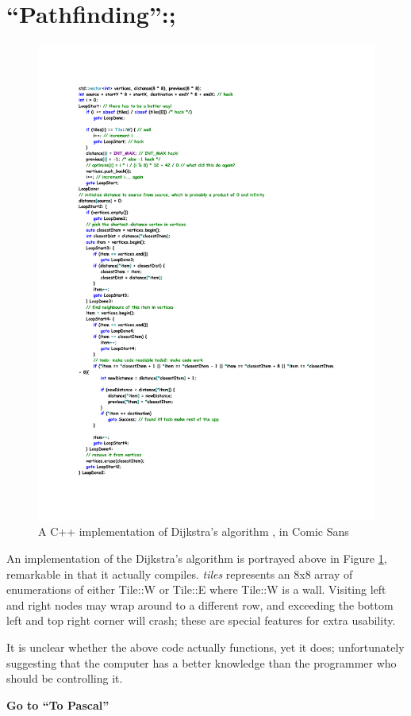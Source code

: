 \documentclass{journal}
\begin{document}
\section{``Pathfinding'':;}
\begin{figure}[h]
\includegraphics[width=0.8\linewidth,scale=0.9]{Pathfinding.pdf}
\caption{A C++ implementation of Dijkstra's algorithm \cite{pathfinding}, in Comic Sans}
\label{fig:comicsans}
\end{figure}

An implementation of the Dijkstra's algorithm \cite{pathfinding} is portrayed above in Figure \ref{fig:comicsans}, remarkable in that it actually compiles. \textit{tiles} represents an 8x8 array of enumerations of either Tile::W or Tile::E where Tile::W is a wall. Visiting left and right nodes may wrap around to a different row, and exceeding the bottom left and top right corner will crash; these are special features for extra usability.

It is unclear whether the above code actually functions, yet it does; unfortunately suggesting that the computer has a better knowledge than the programmer who should be controlling it.

\textbf{Go to ``To Pascal''}



\end{document}
